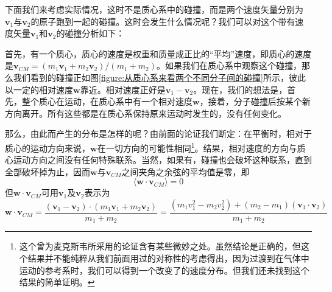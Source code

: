 下面我们来考虑实际情况，这时不是质心系中的碰撞，而是两个速度矢量分别为$\boldsymbol{v}_1$与$\boldsymbol{v}_2$的原子跑到一起的碰撞。这时会发生什么情况呢？我们可以对这个带有速度矢量$\boldsymbol{v}_1$和$\boldsymbol{v}_2$的碰撞分析如下：

首先，有一个质心，质心的速度是权重和质量成正比的“平均”速度，即质心的速度是$\boldsymbol{v}_{CM}=(m_1\boldsymbol{v}_1+m_2\boldsymbol{v}_2)/(m_1+m_2)$。如果我们在质心系中观察这个碰撞，那么我们看到的碰撞正如图\ref{figure:从质心系来看两个不同分子间的碰撞}所示，彼此以一定的相对速度$\boldsymbol{w}$靠近。相对速度正好是$\boldsymbol{v}_1-\boldsymbol{v}_2$。现在，我们的想法是，首先，整个质心在运动，在质心系中有一个相对速度$\boldsymbol{w}$，接着，分子碰撞后按某个新方向离开。所有这些都是在质心系保持原来运动时发生的，没有任何变化。

那么，由此而产生的分布是怎样的呢？由前面的论证我们断定：在平衡时，相对于质心的运动方向来说，$\boldsymbol{w}$在一切方向的可能性相同\footnote{这个曾为麦克斯韦所采用的论证含有某些微妙之处。虽然结论是正确的，但这个结果并不能纯粹从我们前面用过的对称性的考虑得出，因为过渡到在气体中运动的参考系时，我们可以得到一个改变了的速度分布。但我们还未找到这个结果的简单证明。}。结果，相对速度的方向与质心运动方向之间没有任何特殊联系。当然，如果有，碰撞也会破坏这种联系，直到全部破坏掉为止，因而$\boldsymbol{w}$与$\boldsymbol{v}_{CM}$之间夹角之余弦的平均值是零，即
\begin{equation}
    \label{Eq:I:39:19}
    \langle \boldsymbol{w}\cdot\boldsymbol{v}_{CM} \rangle = 0
\end{equation}
但$\boldsymbol{w}\cdot\boldsymbol{v}_{CM}$可用$\boldsymbol{v}_1$及$\boldsymbol{v}_2$表示为
\begin{equation}
    \label{Eq:I:39:20}
    \boldsymbol{w}\cdot\boldsymbol{v}_{CM} = \frac{(\boldsymbol{v}_1 - \boldsymbol{v}_2)\cdot(m_1\boldsymbol{v}_1 + m_2\boldsymbol{v}_2)}{m_1 + m_2} = \frac{(m_1v_1^2 - m_2v_2^2) + (m_2 - m_1)(\boldsymbol{v}_1 \cdot \boldsymbol{v}_2)}{m_1 + m_2}
\end{equation}


